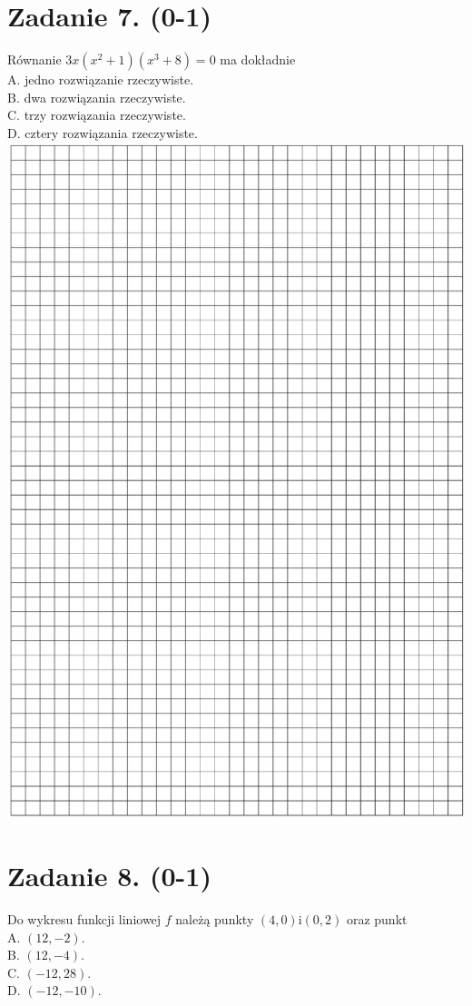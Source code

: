 \documentclass[10pt]{article}
\begin{document}
\section*{Zadanie 7. (0-1)}
Równanie \(3 x\left(x^{2}+1\right)\left(x^{3}+8\right)=0\) ma dokładnie\\
A. jedno rozwiązanie rzeczywiste.\\
B. dwa rozwiązania rzeczywiste.\\
C. trzy rozwiązania rzeczywiste.\\
D. cztery rozwiązania rzeczywiste.\\
\includegraphics[max width=\textwidth, center]{2024_11_21_1e89351873aa60c4c1b9g-03}

\section*{Zadanie 8. (0-1)}
Do wykresu funkcji liniowej \(f\) należą punkty \((4,0) \mathrm{i}(0,2)\) oraz punkt\\
A. \((12,-2)\).\\
B. \((12,-4)\).\\
C. \((-12,28)\).\\
D. \((-12,-10)\).
\end{document}
